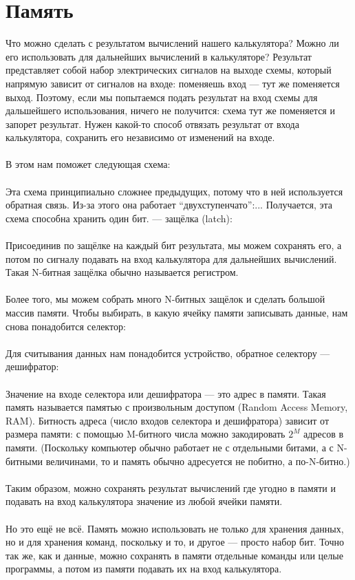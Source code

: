 \documentclass[11pt]{book}
\begin{document}
\section{Память}
Что можно сделать с результатом вычислений нашего калькулятора?
Можно ли его использовать для дальнейших вычислений в калькуляторе?
Результат представляет собой набор электрических сигналов на выходе схемы,
который напрямую зависит от сигналов на входе: поменяешь вход --- тут же поменяется выход.
Поэтому, если мы попытаемся подать результат на вход схемы для дальшейшего использования,
ничего не получится: схема тут же поменяется и запорет результат.
Нужен какой-то способ отвязать результат от входа калькулятора, сохранить его независимо от изменений на входе.
\\ \\
В этом нам поможет следующая схема:
\\
\\
Эта схема принципиально сложнее предыдущих, потому что в ней используется обратная связь.
Из-за этого она работает ``двухступенчато'':...
Получается, эта схема способна хранить один бит.
 --- защёлка (latch):
\\ \\
Присоединив по защёлке на каждый бит результата, мы можем сохранять его,
а потом по сигналу подавать на вход калькулятора для дальнейших вычислений.
Такая N-битная защёлка обычно называется регистром.
\\ \\
Более того, мы можем собрать много N-битных защёлок и сделать большой массив памяти.
Чтобы выбирать, в какую ячейку памяти записывать данные, нам снова понадобится селектор:
\\
\\
Для считывания данных нам понадобится устройство, обратное селектору --- дешифратор:
\\
\\
Значение на входе селектора или дешифратора --- это адрес в памяти.
Такая память называется памятью с произвольным доступом (Random Access Memory, RAM).
Битность адреса (число входов селектора и дешифратора) зависит от размера памяти:
с помощью M-битного числа можно закодировать $2^M$ адресов в памяти.
(Поскольку компьютер обычно работает не с отдельными битами, а с N-битными величинами,
то и память обычно адресуется не побитно, а по-N-битно.)
\\ \\
Таким образом, можно сохранять результат вычислений где угодно в памяти
и подавать на вход калькулятора значение из любой ячейки памяти.
\\ \\
Но это ещё не всё.
Память можно использовать не только для хранения данных, но и для хранения команд,
поскольку и то, и другое --- просто набор бит.
Точно так же, как и данные, можно сохранять в памяти отдельные команды или целые
программы, а потом из памяти подавать их на вход калькулятора.
\end{document}
